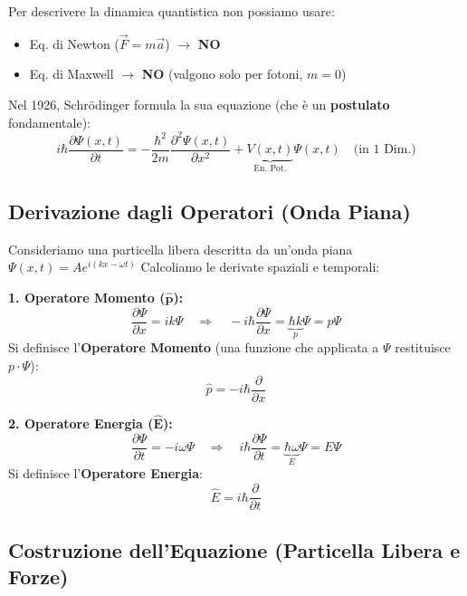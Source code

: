 \documentclass[11pt, a4paper]{article}
\begin{document}
Per descrivere la dinamica quantistica non possiamo usare: %
\begin{itemize}
    \item Eq. di Newton ($\vec{F}=m\vec{a}$) $\rightarrow$ \textbf{NO} %
    \item Eq. di Maxwell $\rightarrow$ \textbf{NO} (valgono solo per fotoni, $m=0$) %
\end{itemize}

Nel 1926, Schrödinger formula la sua equazione (che è un \textbf{postulato} fondamentale): %
\begin{equation}
    \boxed{ i\hbar \frac{\partial \Psi(x,t)}{\partial t} = -\frac{\hbar^2}{2m} \frac{\partial^2 \Psi(x,t)}{\partial x^2} + \underbrace{V(x,t)}_{\text{En. Pot.}} \Psi(x,t) } \quad \text{(in 1 Dim.)} %
\end{equation}

\subsection{Derivazione dagli Operatori (Onda Piana)} %

Consideriamo una particella libera descritta da un'onda piana $\Psi(x,t) = A e^{i(kx - \omega t)}$ %
Calcoliamo le derivate spaziali e temporali: %

\textbf{1. Operatore Momento ($\mathbf{\hat{p}}$):} %
\begin{equation*}
    \frac{\partial \Psi}{\partial x} = ik\Psi \quad \Rightarrow \quad -i\hbar \frac{\partial \Psi}{\partial x} = \underbrace{\hbar k}_{p} \Psi = p\Psi %
\end{equation*}
Si definisce l'\textbf{Operatore Momento} (una funzione che applicata a $\Psi$ restituisce $p\cdot\Psi$): %
\begin{equation}
    \boxed{ \hat{p} = -i\hbar \frac{\partial}{\partial x} } %
\end{equation}

\textbf{2. Operatore Energia ($\mathbf{\hat{E}}$):} %
\begin{equation*}
    \frac{\partial \Psi}{\partial t} = -i\omega\Psi \quad \Rightarrow \quad i\hbar \frac{\partial \Psi}{\partial t} = \underbrace{\hbar \omega}_{E} \Psi = E\Psi %
\end{equation*}
Si definisce l'\textbf{Operatore Energia}: %
\begin{equation}
    \boxed{ \hat{E} = i\hbar \frac{\partial}{\partial t} } %
\end{equation}

\subsection{Costruzione dell'Equazione (Particella Libera e Forze)} %
\end{document}
